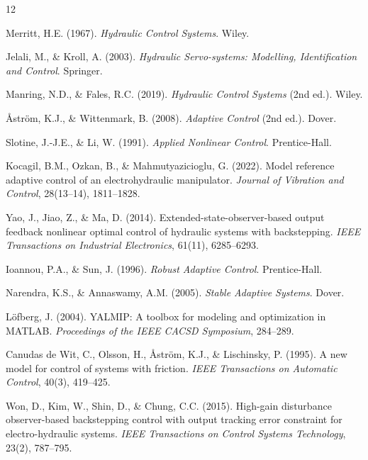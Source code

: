 \documentclass[12pt,a4paper]{article}
\theoremstyle{plain}
\theoremstyle{definition}
\theoremstyle{remark}
\begin{document}

\begin{thebibliography}{12}

Merritt, H.E. (1967).
\textit{Hydraulic Control Systems}.
Wiley.

Jelali, M., \& Kroll, A. (2003).
\textit{Hydraulic Servo-systems: Modelling, Identification and Control}.
Springer.

Manring, N.D., \& Fales, R.C. (2019).
\textit{Hydraulic Control Systems} (2nd ed.).
Wiley.

\AA str\"{o}m, K.J., \& Wittenmark, B. (2008).
\textit{Adaptive Control} (2nd ed.).
Dover.

Slotine, J.-J.E., \& Li, W. (1991).
\textit{Applied Nonlinear Control}.
Prentice-Hall.

Kocagil, B.M., Ozkan, B., \& Mahmutyazicioglu, G. (2022).
Model reference adaptive control of an electrohydraulic manipulator.
\textit{Journal of Vibration and Control}, 28(13--14), 1811--1828.

Yao, J., Jiao, Z., \& Ma, D. (2014).
Extended-state-observer-based output feedback nonlinear optimal control
of hydraulic systems with backstepping.
\textit{IEEE Transactions on Industrial Electronics}, 61(11), 6285--6293.

Ioannou, P.A., \& Sun, J. (1996).
\textit{Robust Adaptive Control}.
Prentice-Hall.

Narendra, K.S., \& Annaswamy, A.M. (2005).
\textit{Stable Adaptive Systems}.
Dover.

L\"{o}fberg, J. (2004).
YALMIP: A toolbox for modeling and optimization in MATLAB.
\textit{Proceedings of the IEEE CACSD Symposium}, 284--289.

Canudas de Wit, C., Olsson, H., \AA str\"{o}m, K.J., \& Lischinsky, P. (1995).
A new model for control of systems with friction.
\textit{IEEE Transactions on Automatic Control}, 40(3), 419--425.

Won, D., Kim, W., Shin, D., \& Chung, C.C. (2015).
High-gain disturbance observer-based backstepping control with output
tracking error constraint for electro-hydraulic systems.
\textit{IEEE Transactions on Control Systems Technology}, 23(2), 787--795.

\end{thebibliography}
\end{document}
